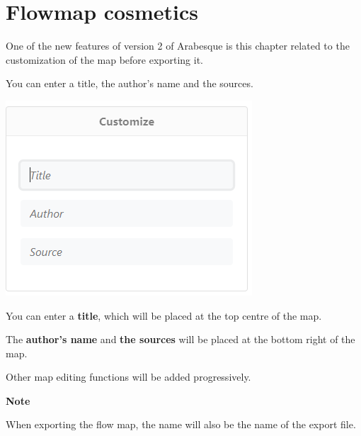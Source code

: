 \documentclass[
  letterpaper,
  DIV=11,
  numbers=noendperiod]{scrreprt}
\begin{document}

\chapter{Flowmap cosmetics}\label{flowmap-cosmetics}

One of the new features of version 2 of Arabesque is this chapter
related to the customization of the map before exporting it.

You can enter a title, the author's name and the sources.

\begin{center}
\includegraphics{images/flowmap-customization.PNG}
\end{center}

You can enter a \textbf{title}, which will be placed at the top centre
of the map.

The \textbf{author's name} and \textbf{the sources} will be placed at
the bottom right of the map.

Other map editing functions will be added progressively.

\begin{tcolorbox}[enhanced jigsaw, rightrule=.15mm, bottomrule=.15mm, colback=white, breakable, opacityback=0, colframe=quarto-callout-note-color-frame, toprule=.15mm, leftrule=.75mm, arc=.35mm, left=2mm]
\begin{minipage}[t]{5.5mm}
\textcolor{quarto-callout-note-color}{\faInfo}
\end{minipage}%
\begin{minipage}[t]{\textwidth - 5.5mm}

\vspace{-3mm}\textbf{Note}\vspace{3mm}

When exporting the flow map, the name will also be the name of the
export file.

\end{minipage}%
\end{tcolorbox}
\end{document}
